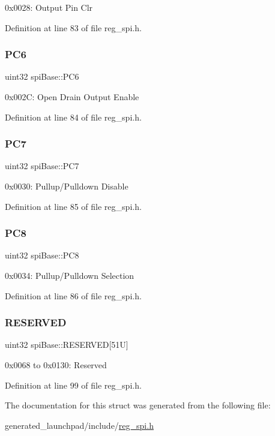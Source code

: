 0x0028\+: Output Pin Clr 

Definition at line 83 of file reg\+\_\+spi.\+h.

\mbox{\label{structspiBase_a69d2b3f0b489e1e1d97230ee5d7d7b85}} 
\subsubsection{\texorpdfstring{P\+C6}{PC6}}
{\footnotesize\ttfamily uint32 spi\+Base\+::\+P\+C6}

0x002C\+: Open Drain Output Enable 

Definition at line 84 of file reg\+\_\+spi.\+h.

\mbox{\label{structspiBase_a0414297155cff5dc698890c298895515}} 
\subsubsection{\texorpdfstring{P\+C7}{PC7}}
{\footnotesize\ttfamily uint32 spi\+Base\+::\+P\+C7}

0x0030\+: Pullup/\+Pulldown Disable 

Definition at line 85 of file reg\+\_\+spi.\+h.

\mbox{\label{structspiBase_a05b2ba057d7d9faadaba337aabae5040}} 
\subsubsection{\texorpdfstring{P\+C8}{PC8}}
{\footnotesize\ttfamily uint32 spi\+Base\+::\+P\+C8}

0x0034\+: Pullup/\+Pulldown Selection 

Definition at line 86 of file reg\+\_\+spi.\+h.

\mbox{\label{structspiBase_aa7777ad73cf8e1d1508fcdce35c39b3e}} 
\subsubsection{\texorpdfstring{R\+E\+S\+E\+R\+V\+ED}{RESERVED}}
{\footnotesize\ttfamily uint32 spi\+Base\+::\+R\+E\+S\+E\+R\+V\+ED\mbox{[}51\+U\mbox{]}}

0x0068 to 0x0130\+: Reserved 

Definition at line 99 of file reg\+\_\+spi.\+h.



The documentation for this struct was generated from the following file\+:\begin{DoxyCompactItemize}
\item 
generated\+\_\+launchpad/include/\mbox{\hyperlink{reg__spi_8h}{reg\+\_\+spi.\+h}}\end{DoxyCompactItemize}
